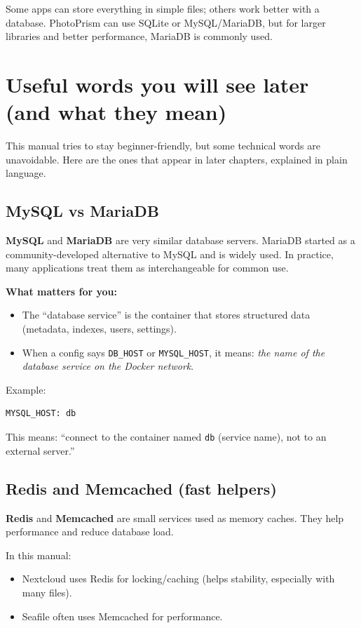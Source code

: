 Some apps can store everything in simple files; others work better with a database.
PhotoPrism can use SQLite or MySQL/MariaDB, but for larger libraries and better performance, MariaDB is commonly used.

\section{Useful words you will see later (and what they mean)}
This manual tries to stay beginner-friendly, but some technical words are unavoidable.
Here are the ones that appear in later chapters, explained in plain language.

\subsection{MySQL vs MariaDB}
\textbf{MySQL} and \textbf{MariaDB} are very similar database servers.
MariaDB started as a community-developed alternative to MySQL and is widely used.
In practice, many applications treat them as interchangeable for common use.

\textbf{What matters for you:}
\begin{itemize}[leftmargin=*]
  \item The ``database service'' is the container that stores structured data (metadata, indexes, users, settings).
  \item When a config says \texttt{DB\_HOST} or \texttt{MYSQL\_HOST}, it means: \emph{the name of the database service on the Docker network}.
\end{itemize}

Example:
\begin{lstlisting}
MYSQL_HOST: db
\end{lstlisting}
This means: ``connect to the container named \texttt{db} (service name), not to an external server.''

\subsection{Redis and Memcached (fast helpers)}
\textbf{Redis} and \textbf{Memcached} are small services used as memory caches.
They help performance and reduce database load.

In this manual:
\begin{itemize}[leftmargin=*]
  \item Nextcloud uses Redis for locking/caching (helps stability, especially with many files).
  \item Seafile often uses Memcached for performance.
\end{itemize}

